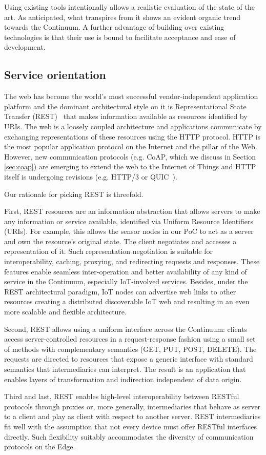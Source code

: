 Using existing tools intentionally allows a realistic evaluation of the state of the art. As anticipated, what transpires from it shows an evident organic trend towards the Continuum. 
A further advantage of building over existing technologies is that their use is bound to facilitate acceptance and ease of development.

\subsection{Service orientation}

The web has become the world's most successful vendor-independent application platform and the dominant architectural style on it is Representational State Transfer (REST)~\cite{rest} that makes information available as resources identified by URIs. The web is a loosely coupled architecture and applications communicate by exchanging representations of these resources using the HTTP protocol. HTTP is the most popular application protocol on the Internet and the pillar of the Web. However, new communication protocols (e.g. CoAP, which we discuss in Section \ref{sec:coap}) are emerging to extend the web to the Internet of Things and HTTP itself is undergoing revisions (e.g. HTTP/3 or QUIC~\cite{langley2017quic}).

Our rationale for picking REST is threefold.\par
First, REST resources are an information abstraction that allows servers to make any information or service available, identified via Uniform Resource Identifiers (URIs). For example, this allows the sensor nodes in our PoC to act as a server and own the resource's original state. The client negotiates and accesses a representation of it. Such representation negotiation is suitable for interoperability, caching, proxying, and redirecting requests and responses. These features enable seamless inter-operation and better availability of any kind of service in the Continuum, especially IoT-involved services. Besides, under the REST architectural paradigm, IoT nodes can advertise web links to other resources creating a distributed discoverable IoT web and resulting in an even more scalable and flexible architecture.\par
Second, REST allows using a uniform interface across the Continuum: clients access server-controlled resources in a request-response fashion using a small set of methods with complementary semantics (GET, PUT, POST, DELETE). The requests are directed to resources that expose a generic interface with standard semantics that intermediaries can interpret. The result is an application that enables layers of transformation and indirection independent of data origin.\par
Third and last, REST enables high-level interoperability between RESTful protocols through proxies or, more generally, intermediaries that behave as server to a client and play as client with respect to another server. REST intermediaries fit well with the assumption that not every device must offer RESTful interfaces directly. Such flexibility suitably accommodates the diversity of communication protocols on the Edge.

